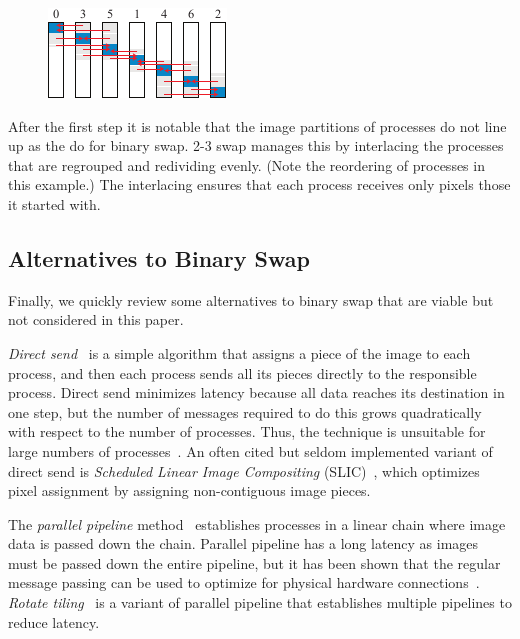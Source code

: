 \documentclass{vgtc}                          %
\newcommand*{\lcite}[1]{~\cite{#1}}
\newcommand*{\keyterm}[1]{\emph{#1}}
\newcommand{\textalgorithm}[1]{\textsf{#1}\xspace}
\newcommand{\Ttswap}{\textalgorithm{2-3 swap}}
\begin{document}
\begin{figure}
  \includegraphics[scale=.75]{2-3-swap-2}
\end{figure}
After the first step it is notable that the image partitions of processes do not line up as the do for binary swap.
\Ttswap manages this by interlacing the processes that are regrouped and redividing evenly.
(Note the reordering of processes in this example.)
The interlacing ensures that each process receives only pixels those it started with.

\subsection{Alternatives to Binary Swap}
\label{sec:BinarySwapAlternatives}

Finally, we quickly review some alternatives to binary swap that are viable but not considered in this paper.

\keyterm{Direct send}\lcite{DirectSend1} is a simple algorithm that assigns a piece of the image to each process, and then each process sends all its pieces directly to the responsible process.
Direct send minimizes latency because all data reaches its destination in one step, but the number of messages required to do this grows quadratically with respect to the number of processes.
Thus, the technique is unsuitable for large numbers of processes\lcite{Moreland2011:SC}.
An often cited but seldom implemented variant of direct send is \keyterm{Scheduled Linear Image Compositing} (SLIC)\lcite{SLIC}, which optimizes pixel assignment by assigning non-contiguous image pieces.

The \keyterm{parallel pipeline} method\lcite{Lee1996} establishes processes in a linear chain where image data is passed down the chain.
Parallel pipeline has a long latency as images must be passed down the entire pipeline, but it has been shown that the regular message passing can be used to optimize for physical hardware connections\lcite{Wu2009}.
\keyterm{Rotate tiling}\lcite{Lin2004} is a variant of parallel pipeline that establishes multiple pipelines to reduce latency.
\end{document}
